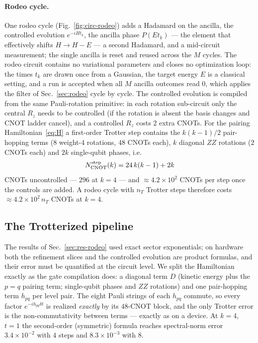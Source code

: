 \documentclass[
  aps,            %
  prc,            %
  reprint,        %
  superscriptaddress,
  floatfix,
  nofootinbib
]{revtex4-2}
\begin{document}
\paragraph{Rodeo cycle.}
One rodeo cycle (Fig.~\ref{fig:circ-rodeo}) adds a Hadamard on the ancilla, the
controlled evolution $e^{-iHt_k}$, the ancilla phase $P(Et_k)$ --- the element
that effectively shifts $H\to H-E$ --- a second Hadamard, and a mid-circuit
measurement; the single ancilla is reset and reused across the $M$ cycles.  The
rodeo circuit contains no variational parameters and closes no optimization
loop: the times $t_k$ are drawn once from a Gaussian, the target energy $E$
is a classical setting, and a run is accepted when all $M$ ancilla outcomes
read $0$, which applies the filter of Sec.~\ref{sec:rodeo} cycle by cycle.
The controlled evolution is
compiled from the same Pauli-rotation primitive: in each rotation sub-circuit
only the central $R_z$ needs to be controlled (if the rotation is absent the
basis changes and CNOT ladder cancel), and a controlled $R_z$ costs $2$ extra
CNOTs.  For the pairing Hamiltonian~\eqref{eq:H} a first-order Trotter step
contains the $k(k{-}1)/2$ pair-hopping terms ($8$ weight-$4$ rotations, $48$
CNOTs each), $k$ diagonal $ZZ$ rotations ($2$ CNOTs each) and $2k$ single-qubit
phases, i.e.
\begin{equation}
  N_{\rm CNOT}^{\rm step}(k)=24\,k(k-1)+2k
  \label{eq:trottercost}
\end{equation}
CNOTs uncontrolled --- $296$ at $k=4$ --- and $\approx 4.2\times10^{2}$ CNOTs per
step once the controls are added.  A rodeo cycle with $n_T$ Trotter steps
therefore costs $\approx 4.2\times10^{2}\,n_T$ CNOTs at $k=4$.


\subsection{The Trotterized pipeline}
\label{sec:trotterized}
The results of Sec.~\ref{sec:res-rodeo} used exact sector exponentials; on
hardware both the refinement slices and the controlled evolution are product
formulas, and their error must be quantified at the circuit level.  We split the
Hamiltonian exactly as the gate compilation does: a diagonal term $D$ (kinetic
energy plus the $p{=}q$ pairing term; single-qubit phases and $ZZ$ rotations)
and one pair-hopping term $h_{pq}$ per level pair.  The eight Pauli strings of
each $h_{pq}$ commute, so every factor $e^{-ih_{pq}\delta t}$ is realized
\emph{exactly} by its $48$-CNOT block, and the only Trotter error is the
non-commutativity between terms --- exactly as on a device.  At $k=4$, $t=1$ the
second-order (symmetric) formula reaches spectral-norm error $3.4\times10^{-2}$
with $4$ steps and $8.3\times10^{-3}$ with $8$.
\end{document}
